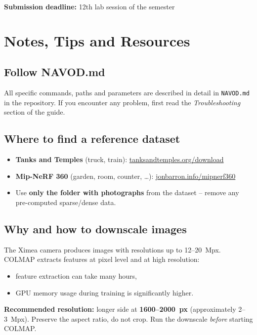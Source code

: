 \documentclass{article}
\begin{document}
\textbf{Submission deadline:} 12th lab session of the semester

\newpage

\section*{Notes, Tips and Resources}

\subsection*{Follow NAVOD.md}

All specific commands, paths and parameters are described in detail in
\texttt{NAVOD.md} in the repository.
If you encounter any problem, first read the \emph{Troubleshooting} section of the guide.

\subsection*{Where to find a reference dataset}

\begin{itemize}
    \item \textbf{Tanks and Temples} (truck, train):
          \href{https://www.tanksandtemples.org/download/}{tanksandtemples.org/download}
    \item \textbf{Mip-NeRF 360} (garden, room, counter, \ldots):
          \href{https://jonbarron.info/mipnerf360/}{jonbarron.info/mipnerf360}
    \item Use \textbf{only the folder with photographs} from the dataset --
          remove any pre-computed sparse/dense data.
\end{itemize}

\subsection*{Why and how to downscale images}

The Ximea camera produces images with resolutions up to 12--20~Mpx.
COLMAP extracts features at pixel level and at high resolution:
\begin{itemize}
    \item feature extraction can take many hours,
    \item GPU memory usage during training is significantly higher.
\end{itemize}
\textbf{Recommended resolution:} longer side at \textbf{1600--2000~px}
(approximately 2--3~Mpx).
Preserve the aspect ratio, do not crop.
Run the downscale \emph{before} starting COLMAP.
\end{document}
